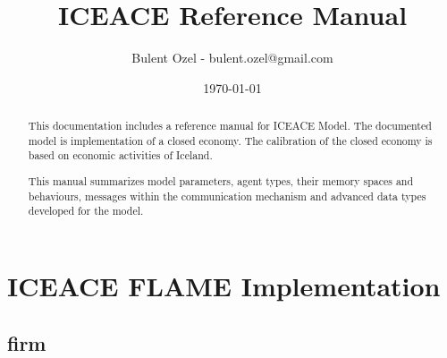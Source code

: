 \documentclass[a4paper,11pt]{article}
\title{ICEACE Reference Manual}
\author{Bulent Ozel - bulent.ozel@gmail.com}
\date{\today}
\begin{document}
\maketitle
\newpage
\begin{abstract}
This documentation includes a reference manual for ICEACE Model. The documented model is implementation of a closed economy. The calibration of the closed economy is based on economic activities of Iceland.

This manual summarizes model parameters, agent types, their memory spaces and behaviours, messages within the communication mechanism and advanced data types developed for the model.
\end{abstract}

\newpage

\tableofcontents
\clearpage

\section{ICEACE FLAME Implementation}

\subsection{firm}
\end{document}
